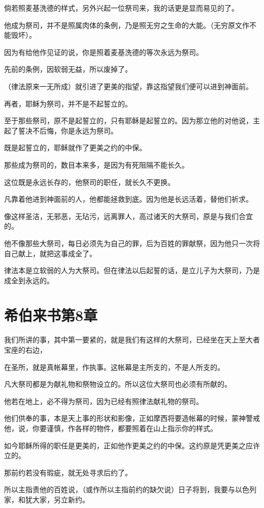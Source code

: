 \documentclass[12pt,oneside]{book}
\begin{document}
倘若照麦基洗德的样式，另外兴起一位祭司来，我的话更是显而易见的了。

他成为祭司，并不是照属肉体的条例，乃是照无穷之生命的大能。（无穷原文作不能毁坏）。

因为有给他作见证的说，你是照着麦基洗德的等次永远为祭司。

先前的条例，因软弱无益，所以废掉了。

（律法原来一无所成）就引进了更美的指望，靠这指望我们便可以进到神面前。

再者，耶稣为祭司，并不是不起誓立的。

至于那些祭司，原不是起誓立的，只有耶稣是起誓立的。因为那立他的对他说，主起了誓决不后悔，你是永远为祭司。

既是起誓立的，耶稣就作了更美之约的中保。

那些成为祭司的，数目本来多，是因为有死阻隔不能长久。

这位既是永远长存的，他祭司的职任，就长久不更换。

凡靠着他进到神面前的人，他都能拯救到底。因为他是长远活着，替他们祈求。

像这样圣洁，无邪恶，无玷污，远离罪人，高过诸天的大祭司，原是与我们合宜的。

他不像那些大祭司，每日必须先为自己的罪，后为百姓的罪献祭，因为他只一次将自己献上，就把这事成全了。

律法本是立软弱的人为大祭司。但在律法以后起誓的话，是立儿子为大祭司，乃是成全到永远的。

\chapter{希伯来书第8章}
我们所讲的事，其中第一要紧的，就是我们有这样的大祭司，已经坐在天上至大者宝座的右边，

在圣所，就是真帐幕里，作执事。这帐幕是主所支的，不是人所支的。

凡大祭司都是为献礼物和祭物设立的。所以这位大祭司也必须有所献的。

他若在地上，必不得为祭司，因为已经有照律法献礼物的祭司。

他们供奉的事，本是天上事的形状和影像，正如摩西将要造帐幕的时候，蒙神警戒他，说，你要谨慎，作各样的物件，都要照着在山上指示你的样式。

如今耶稣所得的职任是更美的，正如他作更美之约的中保。这约原是凭更美之应许立的。

那前约若没有瑕疵，就无处寻求后约了。

所以主指责他的百姓说，（或作所以主指前约的缺欠说）日子将到，我要与以色列家，和犹大家，另立新约。
\end{document}
